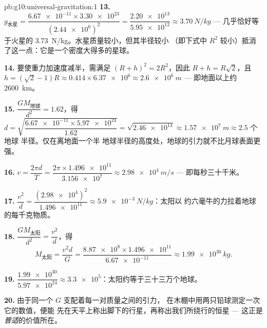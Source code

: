 \begin{solution}{pb:g10:universal-gravitation:1}
\textbf{13.} $g_{\text{水星}} = \dfrac{\num{6.67e-11} \times
\num{3.30e23}}{(\num{2.44e6})^2} = \dfrac{\num{2.20e13}}
{\num{5.95e12}} \approx \qty{3.70}{N/kg}$ --- 几乎恰好等于火星的
\qty{3.73}{N/kg}。水星质量较小，但其半径较小
（即下式中 $R^2$ 较小）抵消了这一点：它是一个密度大得多的星球。

\textbf{14.} 要使重力加速度减半，需满足
$(R + h)^2 = 2 R^2$，因此 $R + h = R\sqrt{2}$，且
$h = (\sqrt{2} - 1) R \approx 0.414 \times \num{6.37e6}
\approx \qty{2.6e6}{m}$ --- 即地面以上约 \qty{2600}{km}。

\textbf{15.} $\dfrac{G M_{\text{地球}}}{d^2} = 1.62$，得
$d = \sqrt{\dfrac{\num{6.67e-11} \times \num{5.97e24}}{1.62}}
= \sqrt{\num{2.46e14}} \approx \qty{1.57e7}{m} \approx 2.5$ 个地球
半径。仅在离地面一个半
地球半径的高度处，地球的引力就不比月球表面更强。

\textbf{16.} $v = \dfrac{2\pi d}{T}
= \dfrac{2\pi \times \num{1.496e11}}{\num{3.156e7}}
\approx \qty{2.98e4}{m/s}$ --- 即每秒三十千米。

\textbf{17.} $\dfrac{v^2}{d} = \dfrac{(\num{2.98e4})^2}{\num{1.496e11}}
\approx \qty{5.9e-3}{N/kg}$：太阳以
约六毫牛的力拉着地球的每千克物质。

\textbf{18.} $\dfrac{G M_{\text{太阳}}}{d^2} = \dfrac{v^2}{d}$，得
\[
M_{\text{太阳}} = \frac{v^2 d}{G}
= \frac{\num{8.87e8} \times \num{1.496e11}}{\num{6.67e-11}}
\approx \qty{1.99e30}{kg}.
\]

\textbf{19.} $\dfrac{\num{1.99e30}}{\num{5.97e24}} \approx
\num{3.3e5}$：太阳约等于三十三万个地球。

\textbf{20.} 由于同一个 $G$ 支配着每一对质量之间的引力，
在木棚中用两只铅球测定一次它的数值，便能
先在天平上称出脚下的行星，再称出我们所绕行的恒星 ---
这正是\emph{普适}的价值所在。
\end{solution}
